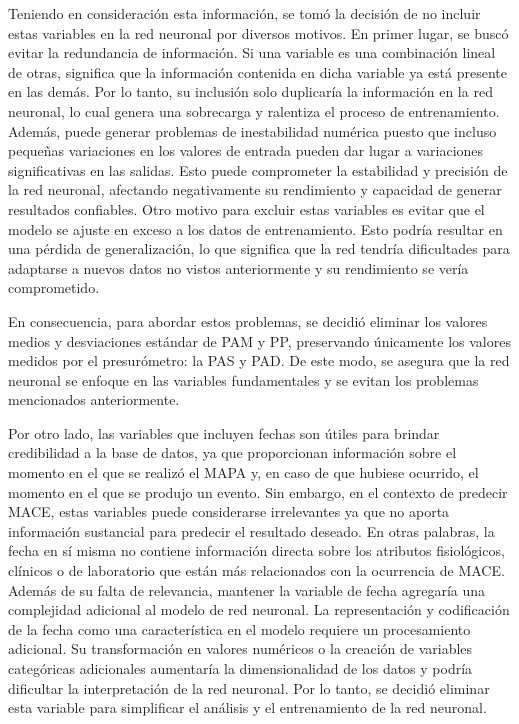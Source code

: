 Teniendo en consideración esta información, se tomó la decisión de no incluir estas variables en 
la red neuronal por diversos motivos. En primer lugar, se buscó evitar la redundancia de información. 
Si una variable es una combinación lineal de otras, significa que la información contenida en 
dicha variable ya está presente en las demás. Por lo tanto, su inclusión solo duplicaría la 
información en la red neuronal, lo cual genera una sobrecarga y ralentiza el proceso de 
entrenamiento. Además, puede generar problemas de inestabilidad numérica puesto que incluso 
pequeñas variaciones en los valores de entrada pueden dar lugar a variaciones significativas 
en las salidas. Esto puede comprometer la estabilidad y precisión de la red neuronal, afectando 
negativamente su rendimiento y capacidad de generar resultados confiables. Otro motivo para 
excluir estas variables es evitar que el modelo se ajuste en exceso a los datos de entrenamiento. 
Esto podría resultar en una pérdida de generalización, lo que significa que la red tendría 
dificultades para adaptarse a nuevos datos no vistos anteriormente y su rendimiento se vería 
comprometido.

En consecuencia, para abordar estos problemas, se decidió eliminar los valores medios y desviaciones 
estándar de PAM y PP, preservando únicamente los valores medidos por el presurómetro: la PAS y PAD. 
De este modo, se asegura que la red neuronal se enfoque en las variables fundamentales y se evitan 
los problemas mencionados anteriormente.

Por otro lado, las variables que incluyen fechas son útiles para brindar credibilidad a 
la base de datos, ya que proporcionan información sobre el momento en el que se realizó el MAPA y, en caso 
de que hubiese ocurrido, el momento en el que se produjo un evento.
Sin embargo, en el contexto de predecir MACE, estas variables puede considerarse irrelevantes ya 
que no aporta información sustancial para predecir el resultado deseado. En otras palabras, 
la fecha en sí misma no contiene información directa sobre los atributos fisiológicos, clínicos 
o de laboratorio que están más relacionados con la ocurrencia de MACE. Además de su falta de 
relevancia, mantener la variable de fecha agregaría una complejidad adicional al modelo 
de red neuronal. La representación y codificación de la fecha como una característica en el 
modelo requiere un procesamiento adicional. Su transformación en valores numéricos o la 
creación de variables categóricas adicionales aumentaría la dimensionalidad de los datos 
y podría dificultar la interpretación de la red neuronal. Por lo tanto, se decidió eliminar 
esta variable para simplificar el análisis y el entrenamiento de la red neuronal. 

